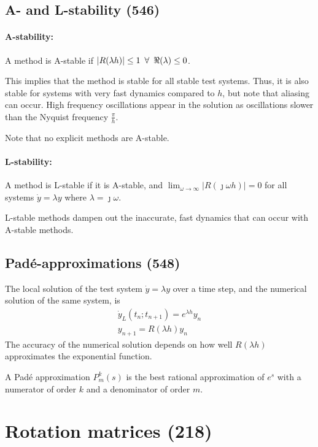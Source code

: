 \documentclass[a4paper, 12pt]{article}
\begin{document}
\subsection{A- and L-stability (546)}
\paragraph{A-stability:} A method is A-stable if \( |R(\lambda h)| \leq 1 \enskip \forall \enskip \Re(\lambda) \leq 0 \).

This implies that the method is stable for all stable test systems. Thus, it is also stable for systems with very fast dynamics compared to \(h\), but note that aliasing can occur. High frequency oscillations appear in the solution as oscillations slower than the Nyquist frequency \( \frac{\pi}{h}\).

Note that no explicit methods are A-stable.

\paragraph{L-stability:} A method is L-stable if it is A-stable, and \(\lim_{\omega \rightarrow \infty} |R(\jmath \omega h)| = 0\) for all systems \( \dot{y} = \lambda y \) where \( \lambda = \jmath \omega \).

L-stable methods dampen out the inaccurate, fast dynamics that can occur with A-stable methods.

\subsection{Padé-approximations (548)}
The local solution of the test system \( \dot{y} = \lambda y \) over a time step, and the numerical solution of the same system, is
\begin{gather}
	\dot{y}_L(t_n; t_{n+1}) = e^{\lambda h} y_n \\
	y_{n+1} = R(\lambda h) y_n
\end{gather}
The accuracy of the numerical solution depends on how well \( R(\lambda h) \) approximates the exponential function.

A Padé approximation \( P^k_m(s) \) is the best rational approximation of \( e^s \) with a numerator of order \(k\) and a denominator of order \(m\).
\section{Rotation matrices (218)}
\end{document}
